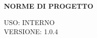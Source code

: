 \documentclass[5pt]{article}
\begin{document}
\vspace{24pt}

\begin{center}
	\textbf{\Large NORME DI PROGETTO }
\end{center}

\vspace{13pt}

\begin{flushright}
	\begin{spacing}{1}
		USO: INTERNO\\
		VERSIONE: 1.0.4\\
	\end{spacing}
\end{flushright}


\restoregeometry

\pagebreak


\pagebreak
\end{document}
